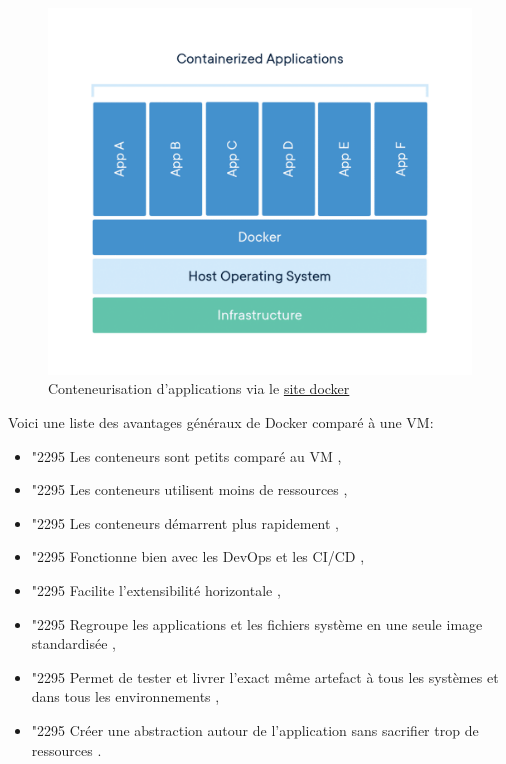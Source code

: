 \documentclass[
    iai, %
    il, %
]{heig-tb}
\begin{document}
\begin{center}
    \begin{figure}
        \includegraphics[width=\textwidth]{./assets/figures/container-what-is-container.png}
        \caption[Conteneurisation d'applications]{Conteneurisation d'applications via
            le \href{https://www.docker.com/wp-content/uploads/2021/11/container-what-is-container.png}{site docker}
            \label{docker-container-app}}
    \end{figure}
\end{center}


Voici une liste des avantages généraux de Docker comparé à une VM:
\begin{itemize}
    \item \char"2295 Les conteneurs sont petits comparé au VM \cite{koukia,nick}, %
    \item \char"2295 Les conteneurs utilisent moins de ressources \cite{koukia},
    \item \char"2295 Les conteneurs démarrent plus rapidement \cite{koukia},
    \item \char"2295 Fonctionne bien avec les DevOps et les CI/CD \cite{koukia,data-flair-pros-cons,data-flair-use-cases},
    \item \char"2295 Facilite l'extensibilité horizontale \cite{data-flair-use-cases},
    \item \char"2295 Regroupe les applications et les fichiers système en une seule image standardisée \cite{kane2018docker},
    \item \char"2295 Permet de tester et livrer l'exact même artefact à tous les systèmes et dans tous les
          environnements \cite{kane2018docker,nick},
    \item \char"2295 Créer une abstraction autour de l'application sans sacrifier trop de ressources \cite{kane2018docker}.
\end{itemize}
\end{document}
